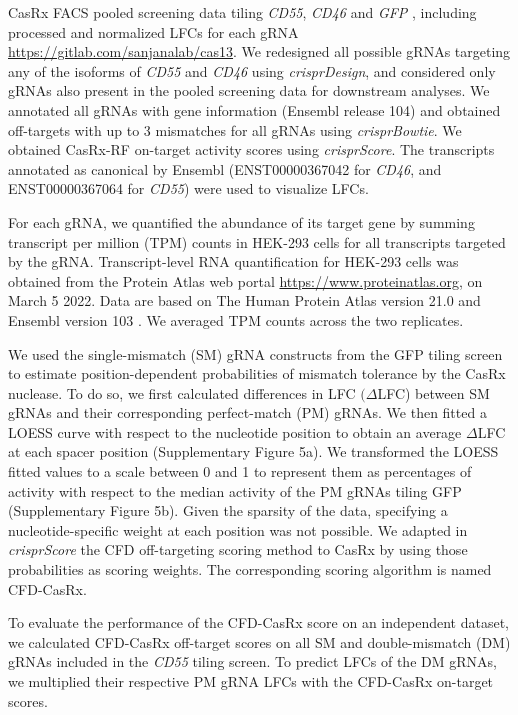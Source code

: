 \documentclass[pdftex,english,10pt]{article}
\begin{document}
{CasRx FACS pooled screening data tiling \textit{CD55}, \textit{CD46} and \textit{GFP} \citep{wessels2020massively}, including processed and normalized LFCs for each gRNA \url{https://gitlab.com/sanjanalab/cas13}. We redesigned all possible gRNAs targeting any of the isoforms of \textit{CD55} and \textit{CD46} using \textit{crisprDesign}, and considered only gRNAs also present in the pooled screening data for downstream analyses. We annotated all gRNAs with gene information (Ensembl release 104) and obtained off-targets with up to 3 mismatches for all gRNAs using \textit{crisprBowtie}. 
We obtained CasRx-RF on-target activity scores using \textit{crisprScore}. 
The transcripts annotated as canonical by Ensembl (ENST00000367042 for \textit{CD46}, and ENST00000367064 for \textit{CD55}) were used to visualize LFCs. 

For each gRNA, we quantified the abundance of its target gene by summing transcript per million (TPM) counts in HEK-293 cells for all transcripts targeted by the gRNA. Transcript-level RNA quantification for HEK-293 cells was obtained from the Protein Atlas web portal \url{https://www.proteinatlas.org},
on March 5 2022. Data are based on The Human Protein Atlas version 21.0 and Ensembl version 103 .
We averaged TPM counts across the two replicates. 

We used the single-mismatch (SM) gRNA constructs from the GFP tiling screen to estimate position-dependent probabilities of mismatch tolerance by the CasRx nuclease. To do so, we first calculated differences in LFC $(\Delta$LFC) between SM gRNAs and their corresponding perfect-match (PM) gRNAs. We then fitted a LOESS curve with respect to the nucleotide position to obtain an average $\Delta$LFC at each spacer position (Supplementary Figure 5a). We transformed the LOESS fitted values to a scale between 0 and 1 to represent them as percentages of activity with respect to the median activity of the PM gRNAs tiling GFP (Supplementary Figure 5b). Given the sparsity of the data, specifying a nucleotide-specific weight at each position was not possible. We adapted in \textit{crisprScore} the CFD off-targeting scoring method to CasRx by using those probabilities as scoring weights. The corresponding scoring algorithm is named CFD-CasRx. 

To evaluate the performance of the CFD-CasRx score on an independent dataset, we calculated CFD-CasRx off-target scores on all SM and double-mismatch (DM) gRNAs included in the \textit{CD55} tiling screen. To predict LFCs of the DM gRNAs, we multiplied their respective PM gRNA LFCs with the CFD-CasRx on-target scores. 


}
\end{document}
